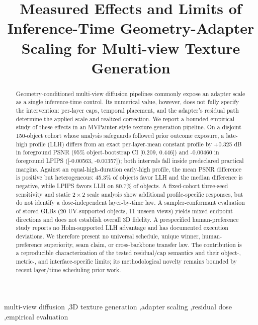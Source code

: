 \documentclass[times,twocolumn,final]{elsarticle}
\begin{document}
\begin{frontmatter}

\title{Measured Effects and Limits of Inference-Time Geometry-Adapter Scaling for Multi-view Texture Generation}


\begin{abstract}
Geometry-conditioned multi-view diffusion pipelines commonly expose an adapter scale as a single inference-time control. Its numerical value, however, does not fully specify the intervention: per-layer caps, temporal placement, and the adapter's residual path determine the applied scale and realized correction. We report a bounded empirical study of these effects in an MVPainter-style texture-generation pipeline. On a disjoint 150-object cohort whose analysis safeguards followed prior outcome exposure, a late-high profile (LLH) differs from an exact per-layer-mean constant profile by +0.325 dB in foreground PSNR (95\% object-bootstrap CI [0.209, 0.446]) and -0.00460 in foreground LPIPS ([-0.00563, -0.00357]); both intervals fall inside predeclared practical margins. Against an equal-high-duration early-high profile, the mean PSNR difference is positive but heterogeneous: 45.3\% of objects favor LLH and the median difference is negative, while LPIPS favors LLH on 80.7\% of objects. A fixed-cohort three-seed sensitivity and static 2\,$\times$\,2 scale analysis show additional profile-specific responses, but do not identify a dose-independent layer-by-time law. A sampler-conformant evaluation of stored GLBs (20 UV-supported objects, 11 unseen views) yields mixed endpoint directions and does not establish overall 3D fidelity. A prespecified human-preference study reports no Holm-supported LLH advantage and has documented execution deviations. We therefore present no universal schedule, unique winner, human-preference superiority, seam claim, or cross-backbone transfer law. The contribution is a reproducible characterization of the tested residual/cap semantics and their object-, metric-, and interface-specific limits; its methodological novelty remains bounded by recent layer/time scheduling prior work.
\end{abstract}

\begin{keyword}
\KWD
multi-view diffusion \sep 3D texture generation \sep adapter scaling \sep residual dose \sep empirical evaluation
\end{keyword}

\end{frontmatter}
\linenumbers
\end{document}
